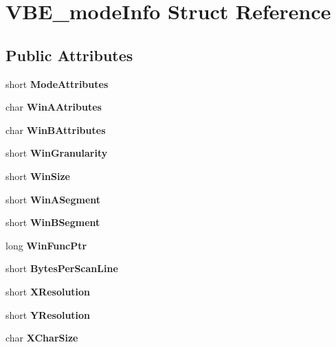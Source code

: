 \section{V\-B\-E\-\_\-mode\-Info Struct Reference}
\label{structVBE__modeInfo}
\subsection*{Public Attributes}
\begin{DoxyCompactItemize}
\item 
short {\bfseries Mode\-Attributes}\label{structVBE__modeInfo_a01798e071e68999e1b051499a2a8f620}

\item 
char {\bfseries Win\-A\-Atributes}\label{structVBE__modeInfo_a1ebd974f8853848ac690ed9e537b088a}

\item 
char {\bfseries Win\-B\-Attributes}\label{structVBE__modeInfo_a904d0a267b1d256b9bd8f6c76df0a849}

\item 
short {\bfseries Win\-Granularity}\label{structVBE__modeInfo_ab85010d70082042c20a1a74bb9604b35}

\item 
short {\bfseries Win\-Size}\label{structVBE__modeInfo_a4e5b811e8eef291a6eab4a888b7f676e}

\item 
short {\bfseries Win\-A\-Segment}\label{structVBE__modeInfo_a8258cb5a4a059737d90e753d78558103}

\item 
short {\bfseries Win\-B\-Segment}\label{structVBE__modeInfo_a08d0c7fc57f203297339e8c64d90cf8d}

\item 
long {\bfseries Win\-Func\-Ptr}\label{structVBE__modeInfo_a9c50de0da88113c0a5f7078e9f4f518c}

\item 
short {\bfseries Bytes\-Per\-Scan\-Line}\label{structVBE__modeInfo_acdb4b4dabca6238b6e7e99ede5a5a966}

\item 
short {\bfseries X\-Resolution}\label{structVBE__modeInfo_a019d9f850d5c20541d2ff300c0d78a25}

\item 
short {\bfseries Y\-Resolution}\label{structVBE__modeInfo_a092c6196879bb11269322284280335b9}

\item 
char {\bfseries X\-Char\-Size}\label{structVBE__modeInfo_aec03794d29d1d7ac2a2e88042984e5d8}


\end{DoxyCompactItemize}
